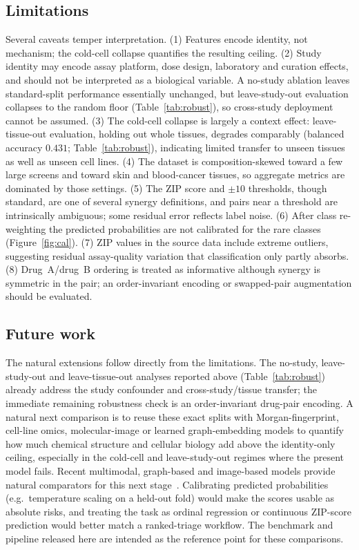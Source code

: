 \documentclass{bmcart}
\begin{document}
\subsection*{Limitations}
Several caveats temper interpretation. (1) Features encode identity, not mechanism; the cold-cell
collapse quantifies the resulting ceiling. (2) Study identity may encode assay platform, dose design,
laboratory and curation effects, and should not be interpreted as a biological variable. A no-study
ablation leaves standard-split performance essentially unchanged, but leave-study-out evaluation
collapses to the random floor (Table~\ref{tab:robust}), so cross-study deployment cannot be assumed.
(3) The cold-cell collapse is largely a context effect: leave-tissue-out evaluation, holding out whole
tissues, degrades comparably (balanced accuracy $0.431$; Table~\ref{tab:robust}), indicating limited
transfer to unseen tissues as well as unseen cell lines. (4) The dataset is composition-skewed
toward a few large screens and toward skin and blood-cancer tissues, so aggregate metrics are dominated
by those settings. (5) The ZIP score and $\pm 10$ thresholds, though standard, are one of several
synergy definitions, and pairs near a threshold are intrinsically ambiguous; some residual error
reflects label noise. (6) After class re-weighting the predicted probabilities are not calibrated for
the rare classes (Figure~\ref{fig:cal}). (7) ZIP values in the source data include extreme outliers,
suggesting residual assay-quality variation that classification only partly absorbs. (8) Drug~A/drug~B
ordering is treated as informative although synergy is symmetric in the pair; an order-invariant
encoding or swapped-pair augmentation should be evaluated.

\subsection*{Future work}
The natural extensions follow directly from the limitations. The no-study, leave-study-out and
leave-tissue-out analyses reported above (Table~\ref{tab:robust}) already address the study confounder
and cross-study/tissue transfer; the immediate remaining robustness check is an order-invariant
drug-pair encoding. A natural next comparison is to reuse these exact splits with Morgan-fingerprint,
cell-line omics, molecular-image or learned graph-embedding models to quantify how much chemical
structure and cellular biology add above the identity-only ceiling, especially in the cold-cell and
leave-study-out regimes where the present model fails. Recent
multimodal, graph-based and image-based models provide natural comparators for this next
stage~\cite{monem2024,besharatifard2024,mehrabani2025}. Calibrating predicted probabilities (e.g.\
temperature scaling on a held-out fold) would make the scores usable as absolute risks, and treating
the task as ordinal regression or continuous ZIP-score prediction would better match a ranked-triage
workflow. The benchmark and pipeline released here are intended as the reference point for these
comparisons.
\end{document}
